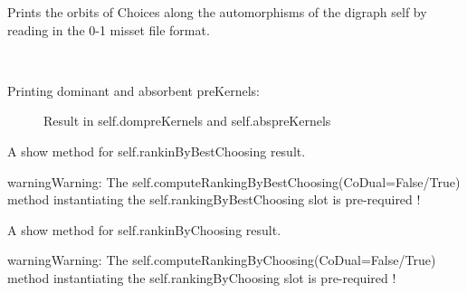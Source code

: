 \documentclass[letterpaper,10pt,english]{sphinxmanual}
\begin{document}
\begin{fulllineitems}
\begin{fulllineitems}
\label{techDoc:digraphs.Digraph.showOrbitsFromFile}
Prints the orbits of Choices along the automorphisms of
the digraph self by reading in the 0-1 misset file format.

\end{fulllineitems}


\begin{fulllineitems}
\label{techDoc:digraphs.Digraph.showPreKernels}~\begin{description}
\item[{Printing dominant and absorbent preKernels:}] \leavevmode
Result in self.dompreKernels and self.abspreKernels

\end{description}

\end{fulllineitems}


\begin{fulllineitems}
\label{techDoc:digraphs.Digraph.showRankingByBestChoosing}
A show method for self.rankinByBestChoosing result.

\begin{notice}{warning}{Warning:}
The self.computeRankingByBestChoosing(CoDual=False/True) method instantiating the self.rankingByBestChoosing slot is pre-required !
\end{notice}

\end{fulllineitems}


\begin{fulllineitems}
\label{techDoc:digraphs.Digraph.showRankingByChoosing}
A show method for self.rankinByChoosing result.

\begin{notice}{warning}{Warning:}
The self.computeRankingByChoosing(CoDual=False/True) method instantiating the self.rankingByChoosing slot is pre-required !
\end{notice}


\end{fulllineitems}
\end{fulllineitems}
\end{document}
